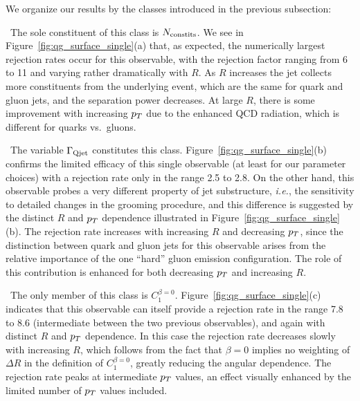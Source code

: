  We organize our results by the classes introduced in the previous subsection:

~The sole constituent of this class is $N_{\rm constits}$. We see in  Figure~\ref{fig:qg_surface_single}(a) that, as expected,  the numerically largest rejection rates occur
for this observable, with the rejection factor ranging from 6 to 11 and 
varying rather dramatically with $R$.  As $R$ increases the jet collects more constituents from the underlying event, which are the same
for quark and gluon jets, and the separation power decreases.  At large $R$, there is some improvement with increasing $p_T$ due to the 
enhanced QCD radiation, which is different for quarks vs.~gluons.  

~The variable $\Gamma_{\rm Qjet}$ constitutes this class. Figure~\ref{fig:qg_surface_single}(b) confirms the limited efficacy of this single
observable (at least for our parameter choices) with a rejection rate only in the range 2.5 to 2.8.  On the other hand, this 
observable probes a very different
property of jet substructure, \textit{i.e.}, the sensitivity to detailed changes in the grooming procedure, and this difference is suggested
by the distinct $R$ and $p_T$ dependence illustrated in  Figure~\ref{fig:qg_surface_single}(b).  The rejection rate increases with increasing $R$
and decreasing $p_T$, since the distinction between quark and gluon jets for this observable arises from the relative importance of the one
``hard'' gluon emission configuration.  The role of this contribution is enhanced for both decreasing $p_T$ and increasing $R$. 


~The only member of this class is $C_1^{\beta=0}$. Figure~\ref{fig:qg_surface_single}(c) indicates that this observable  can itself provide a rejection rate in the range
7.8 to 8.6 (intermediate between the two previous observables), and again with distinct $R$ and $p_T$ dependence.  In this case the rejection
rate decreases slowly with increasing $R$, which follows from the fact that $\beta = 0$ implies no weighting of $\Delta R$ in the definition of $C_1^{\beta=0}$, greatly reducing 
the angular dependence.
The rejection rate peaks at intermediate $p_T$ values, an effect visually enhanced by the limited number of 
$p_T$ values included.  



